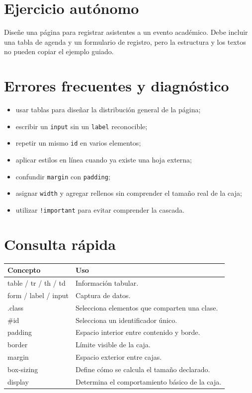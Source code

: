 \documentclass[11pt]{article}
\begin{document}
\section{Ejercicio autónomo}
Diseñe una página para registrar asistentes a un evento académico. Debe incluir una tabla de agenda y un formulario de registro, pero la estructura y los textos no pueden copiar el ejemplo guiado.

\section{Errores frecuentes y diagnóstico}
\begin{itemize}
    \item usar tablas para diseñar la distribución general de la página;
    \item escribir un \texttt{input} sin un \texttt{label} reconocible;
    \item repetir un mismo \texttt{id} en varios elementos;
    \item aplicar estilos en línea cuando ya existe una hoja externa;
    \item confundir \texttt{margin} con \texttt{padding};
    \item asignar \texttt{width} y agregar rellenos sin comprender el tamaño real de la caja;
    \item utilizar \texttt{!important} para evitar comprender la cascada.
\end{itemize}

\section{Consulta rápida}
\begin{center}
\begin{tabularx}{0.95\linewidth}{>{\ttfamily}p{3.7cm}X}
\toprule
\textnormal{Concepto} & \textnormal{Uso}\\
\midrule
table / tr / th / td & Información tabular.\\
form / label / input & Captura de datos.\\
.class & Selecciona elementos que comparten una clase.\\
\#id & Selecciona un identificador único.\\
padding & Espacio interior entre contenido y borde.\\
border & Límite visible de la caja.\\
margin & Espacio exterior entre cajas.\\
box-sizing & Define cómo se calcula el tamaño declarado.\\
display & Determina el comportamiento básico de la caja.\\
\bottomrule
\end{tabularx}
\end{center}
\end{document}
